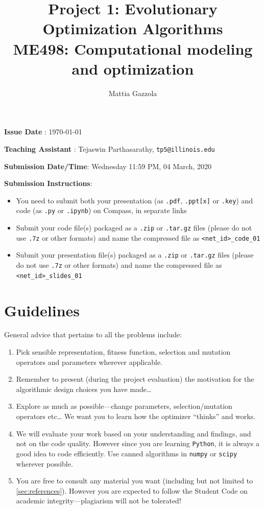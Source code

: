 \documentclass[11pt]{article}
\author{Mattia Gazzola}
\date{}
\title{Project 1: Evolutionary Optimization Algorithms\\\medskip
\large ME498: Computational modeling and optimization}
\begin{document}
\maketitle
{}


\textbf{Issue Date} : \today

\textbf{Teaching Assistant} : Tejaswin Parthasarathy, \texttt{tp5@illinois.edu}

\textbf{Submission Date/Time}: Wednesday 11:59 PM, 04 March, 2020

\textbf{Submission Instructions}:
\begin{itemize}
\item You need to submit both your presentation (as \texttt{.pdf}, \texttt{.ppt[x]} or \texttt{.key}) and code
(as \texttt{.py} or \texttt{.ipynb}) on Compass, in separate links
\item Submit your code file(s) packaged as a \texttt{.zip} or \texttt{.tar.gz} files (please do not use
\texttt{.7z} or other formats) and name the compressed file as \texttt{<net\_id>\_code\_01}
\item Submit your presentation file(s) packaged as a \texttt{.zip} or \texttt{.tar.gz} files (please do not use
\texttt{.7z} or other formats) and name the compressed file as \texttt{<net\_id>\_slides\_01}
\end{itemize}

\section{Guidelines}
\label{sec:org945a6bb}
General advice that pertains to all the problems include:
\begin{enumerate}
\item Pick sensible representation, fitness function, selection and mutation
operators and parameters wherever applicable.
\item Remember to present (during the project evaluation) the motivation for the
algorithmic design choices you have made\ldots{}
\item Explore as much as possible---change parameters, selection/mutation
operators etc\ldots{} We want you to learn how the optimizer ``thinks'' and works.
\item We will evaluate your work based on your understanding and findings, and
not on the code quality. However since you are learning \texttt{Python}, it is
always a good idea to code efficiently. Use canned algorithms in \texttt{numpy} or
\texttt{scipy} wherever possible.
\item You are free to consult any material you want (including but not limited to
\cref{sec:references}). However you are expected to follow the Student Code
on academic integrity---plagiarism will not be tolerated!
\end{enumerate}
\end{document}
